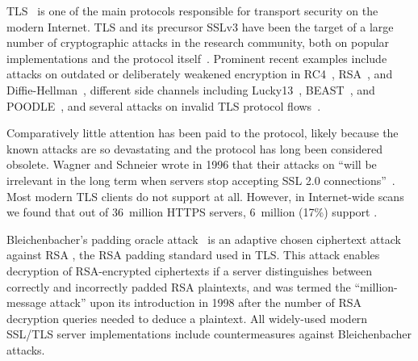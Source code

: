 TLS~\cite{rfc5246} is one of the main protocols
responsible for transport security on the modern Internet.
TLS and its precursor SSLv3 have been the target of a large number of cryptographic attacks in
the research community, both on popular implementations and the
protocol itself~\cite{2013:01:briefChronologyOfSSLTLSAttacks}.
Prominent recent examples include attacks on outdated or deliberately
weakened encryption in RC4~\cite{RC4biases}, RSA~\cite{SMACKTLS}, and
Diffie-Hellman~\cite{LogJam}, different side channels including
Lucky13~\cite{Lucky13}, BEAST~\cite{BEAST}, and POODLE~\cite{POODLE},
and several attacks on invalid TLS protocol
flows~\cite{SMACKTLS,ProtocolStateFuzzing15,TripleHandshake}.

Comparatively little attention has been paid to the \ssltwo protocol,
likely because the known attacks are so devastating and the protocol
has long been considered obsolete.  Wagner and Schneier wrote in 1996 that
their attacks on \ssltwo ``will be irrelevant in the long term
when servers stop accepting SSL 2.0 connections''~\cite{WagnerSchneier:SSLAnalysis:96}.
Most modern TLS clients do not support \ssltwo at all.
However, in Internet-wide scans we found that out of 36~million
HTTPS servers, 6~million (17\%) support \ssltwo.


Bleichenbacher's padding oracle attack~\cite{Bleichenbacher} is an
adaptive chosen ciphertext attack against RSA \PKCS, the RSA padding
standard used in TLS\@.  This attack enables decryption of RSA-encrypted
ciphertexts if a server distinguishes between correctly and
incorrectly padded RSA plaintexts, and was termed the
``million-message attack'' upon its introduction in 1998 after the
number of RSA decryption queries needed to deduce a plaintext.  All
widely-used modern SSL/TLS server implementations include
countermeasures against Bleichenbacher attacks.

